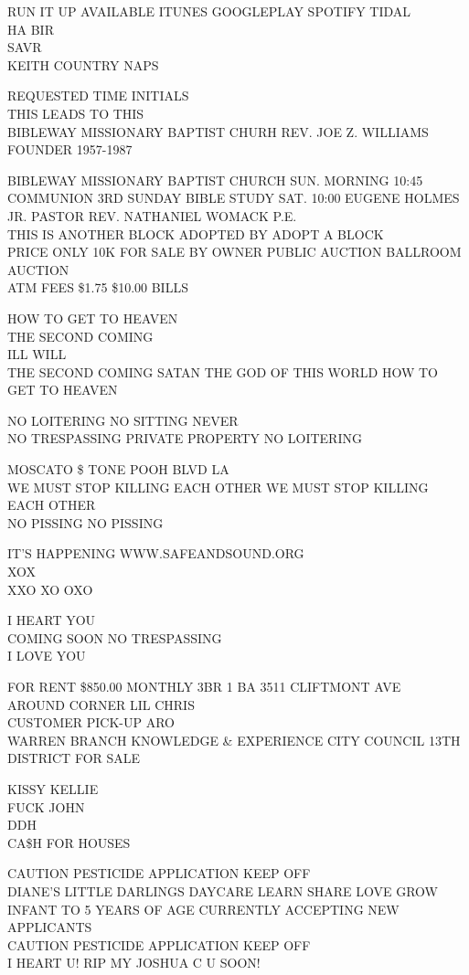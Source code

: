 \documentclass[10pt,letterpaper]{article}
\begin{document}
RUN IT UP AVAILABLE ITUNES GOOGLEPLAY SPOTIFY TIDAL\\
HA BIR\\
SAVR\\
KEITH COUNTRY NAPS

REQUESTED TIME INITIALS\\
THIS LEADS TO THIS\\
BIBLEWAY MISSIONARY BAPTIST CHURH REV. JOE Z. WILLIAMS FOUNDER 1957{-}1987

BIBLEWAY MISSIONARY BAPTIST CHURCH SUN. MORNING 10:45 COMMUNION 3RD SUNDAY BIBLE STUDY SAT. 10:00 EUGENE HOLMES JR. PASTOR REV. NATHANIEL WOMACK P.E.\\
THIS IS ANOTHER BLOCK ADOPTED BY ADOPT A BLOCK\\
PRICE ONLY 10K FOR SALE BY OWNER PUBLIC AUCTION BALLROOM AUCTION\\
ATM FEES \$1.75 \$10.00 BILLS

HOW TO GET TO HEAVEN\\
THE SECOND COMING\\
ILL WILL\\
THE SECOND COMING SATAN THE GOD OF THIS WORLD HOW TO GET TO HEAVEN

NO LOITERING NO SITTING NEVER\\
NO TRESPASSING PRIVATE PROPERTY NO LOITERING

MOSCATO \$ TONE POOH BLVD LA\\
WE MUST STOP KILLING EACH OTHER WE MUST STOP KILLING EACH OTHER\\
NO PISSING NO PISSING

IT'S HAPPENING WWW.SAFEANDSOUND.ORG\\
XOX\\
XXO XO OXO

I HEART YOU\\
COMING SOON NO TRESPASSING\\
I LOVE YOU

FOR RENT \$850.00 MONTHLY 3BR 1 BA 3511 CLIFTMONT AVE\\
AROUND CORNER LIL CHRIS\\
CUSTOMER PICK{-}UP ARO\\
WARREN BRANCH KNOWLEDGE \& EXPERIENCE CITY COUNCIL 13TH DISTRICT FOR SALE

KISSY KELLIE\\
FUCK JOHN\\
DDH\\
CA\$H FOR HOUSES

CAUTION PESTICIDE APPLICATION KEEP OFF\\
DIANE'S LITTLE DARLINGS DAYCARE LEARN SHARE LOVE GROW INFANT TO 5 YEARS OF AGE CURRENTLY ACCEPTING NEW APPLICANTS\\
CAUTION PESTICIDE APPLICATION KEEP OFF\\
I HEART U!  RIP MY JOSHUA C U SOON!
\end{document}
